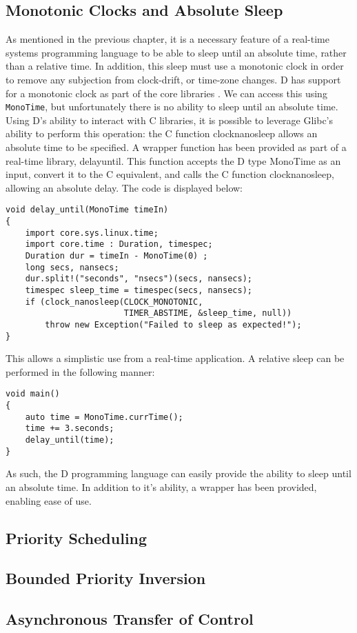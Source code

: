 \subsection{Monotonic Clocks and Absolute Sleep}
As mentioned in the previous chapter, it is a necessary feature of a real-time 
systems programming language to be able to sleep until an absolute time, rather 
than a relative time. In addition, this sleep must use a monotonic clock in order 
to remove any subjection from clock-drift, or time-zone changes. D has support 
for a monotonic clock as part of the core libraries 
\cite{http://dlang.org/phobos/core_time.html}. We can access this using 
\texttt{MonoTime}, but unfortunately there is no ability to sleep until an 
absolute time. Using D's ability to interact with C libraries, it is possible 
to leverage Glibc's ability to perform this operation: the C function 
clock\textunderscore{}nanosleep allows an absolute time to be specified.
\cite{http://man7.org/linux/man-pages/man2/clock_nanosleep.2.html}
A wrapper function has been provided as part of a real-time library, delay\textunderscore{}until. 
This function accepts the D type MonoTime as an input, convert it to the C 
equivalent, and calls the C function clock\textunderscore{}nanosleep, allowing an absolute delay.
The code is displayed below: 
\begin{lstlisting}
void delay_until(MonoTime timeIn)
{
    import core.sys.linux.time; 
    import core.time : Duration, timespec; 
    Duration dur = timeIn - MonoTime(0) ;
    long secs, nansecs; 
    dur.split!("seconds", "nsecs")(secs, nansecs); 
    timespec sleep_time = timespec(secs, nansecs); 
    if (clock_nanosleep(CLOCK_MONOTONIC, 
                        TIMER_ABSTIME, &sleep_time, null))
        throw new Exception("Failed to sleep as expected!"); 
}
\end{lstlisting}
This allows a simplistic use from a real-time application. A relative sleep can 
be performed in the following manner: 
\begin{lstlisting}
void main()
{
    auto time = MonoTime.currTime(); 
    time += 3.seconds; 
    delay_until(time);
}
\end{lstlisting}
As such, the D programming language can easily provide the ability to sleep 
until an absolute time. In addition to it's ability, a wrapper has been provided, 
enabling ease of use. 

\subsection{Priority Scheduling}

\subsection{Bounded Priority Inversion}

\subsection{Asynchronous Transfer of Control}
